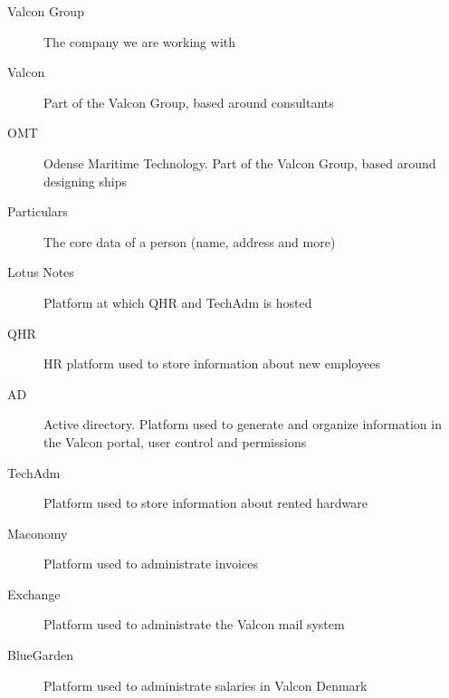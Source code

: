 \begin{description}
\item[Valcon Group] The company we are working with 
\item[Valcon] Part of the Valcon Group, based around consultants
\item[OMT] Odense Maritime Technology. Part of the Valcon Group, based around designing ships
\item[Particulars] The core data of a person (name, address and more)
\item[Lotus Notes] Platform at which QHR and TechAdm is hosted
\item[QHR] HR platform used to store information about new employees
\item[AD] Active directory. Platform used to generate and organize information in the Valcon portal, user control and permissions
\item[TechAdm] Platform used to store information about rented hardware
\item[Maconomy] Platform used to administrate invoices
\item[Exchange] Platform used to administrate the Valcon mail system
\item[BlueGarden] Platform used to administrate salaries in Valcon Denmark
\end{description}

